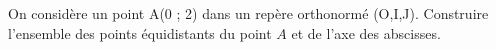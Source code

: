 
On considère un point A(0 ; 2) dans un repère orthonormé (O,I,J). Construire l'ensemble des points équidistants du point $A$ et de l’axe des abscisses.  
